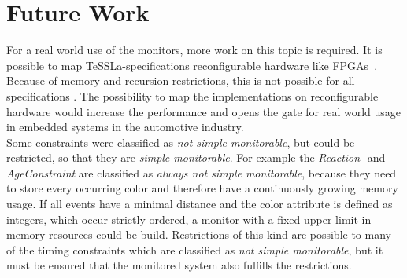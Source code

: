 \section{Future Work}
	For a real world use of the monitors, more work on this topic is required. It is possible to map TeSSLa-specifications reconfigurable hardware like FPGAs~\cite{8342124}. Because of memory and recursion restrictions, this is not possible for all specifications . %
	The possibility to map the implementations on reconfigurable hardware would increase the performance and opens the gate for real world usage in embedded systems in the automotive industry.\\
	Some constraints were classified as \textit{not simple monitorable}, but could be restricted, so that they are \textit{simple monitorable}. For example the \textit{Reaction-} and \textit{AgeConstraint} are classified as \textit{always not simple monitorable}, because they need to store every occurring color and therefore have a continuously growing memory usage. If all events have a minimal distance and the color attribute is defined as integers, which occur strictly ordered, a monitor with a fixed upper limit in memory resources could be build. Restrictions of this kind are possible to many of the timing constraints which are classified as \textit{not simple monitorable}, but it must be ensured that the monitored system also fulfills the restrictions.





